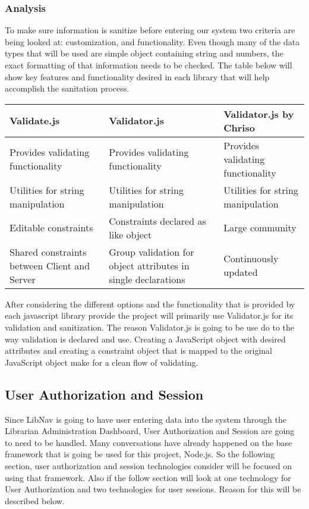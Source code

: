 \documentclass[letterpaper,10pt,titlepage, onecolumn, compsoc]{IEEEtran}
\begin{document}
\subsubsection{Analysis}
To make sure information is sanitize before entering our system two criteria are being looked at: customization, and functionality. Even though many of the data types that will be used are simple object containing string and numbers, the exact formatting of that information needs to be checked. The table below will show key features and functionality desired in each library that will help accomplish the sanitation process.

\begin{center}
\begin{tabular}{|p{4.25cm}|p{4.25cm}|p{4.25cm}|}
\hline
\textbf{Validate.js}& \textbf{Validator.js}& \textbf{Validator.js by Chriso}   
\\ \hline
Provides validating functionality            & Provides validating functionality                             & Provides validating functionality 
\\ \hline
Utilities for string manipulation            & Utilities for string manipulation                             & Utilities for string manipulation 
\\ \hline
Editable constraints                         & Constraints declared as like object                           & Large community                   
\\ \hline
Shared constraints between Client and Server & Group validation for object attributes in single declarations & Continuously updated              
\\ \hline
\end{tabular}
\end{center}
After considering the different options and the functionality that is provided by each javascript library provide the project will primarily use Validator.js for its validation and sanitization. The reason Validator.js is going to be use do to the way validation is declared and use. Creating a JavaScript object with desired attributes and creating a constraint object that is mapped to the original JavaScript object make for a clean flow of validating.

\subsection{User Authorization and Session}
Since LibNav is going to have user entering data into the system through the Librarian Administration Dashboard, User Authorization and Session are going to need to be handled. Many conversations have already happened on the base framework that is going be used for this project, Node.js. So the following section, user authorization and session technologies consider will be focused on using that framework. Also if the follow section will look at one technology for User Authorization and two technologies for user sessions. Reason for this will be described below.
\end{document}
